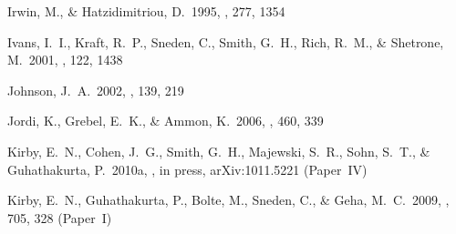 \documentclass{emulateapj}
\begin{document}
\begin{thebibliography}{}









 Irwin, M., \&
  Hatzidimitriou, D.\ 1995, \mnras, 277, 1354


 Ivans, I.~I., Kraft, R.~P.,
  Sneden, C., Smith, G.~H., Rich, R.~M., \& Shetrone, M.\ 2001, \aj,
  122, 1438

 Johnson, J.~A.\ 2002, \apjs, 139, 219

 Jordi, K.,
  Grebel, E.~K., \& Ammon, K.\ 2006, \aap, 460, 339


 Kirby, E.~N., Cohen,
  J.~G., Smith, G.~H., Majewski, S.~R., Sohn, S.~T., \& Guhathakurta,
  P.\ 2010a, \apj, in press, arXiv:1011.5221 (Paper~IV)

 Kirby, E.~N.,
  Guhathakurta, P., Bolte, M., Sneden, C., \& Geha, M.~C.\ 2009, \apj,
  705, 328 (Paper~I)


\end{thebibliography}
\end{document}
